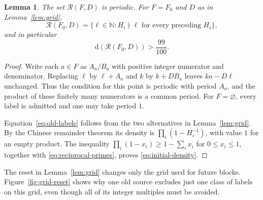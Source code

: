 \documentclass[11pt,reqno]{amsart}
\newtheorem{lemma}[theorem]{Lemma}
\theoremstyle{definition}
\theoremstyle{remark}
\numberwithin{equation}{section}
\newcommand{\N}{\mathbb N}
\newcommand{\dens}{\mathrm d}
\newcommand{\cR}{\mathcal R}
\begin{document}
\begin{lemma}\label{lem:periodicity}
The set $\cR(F,D)$ is periodic. For $F=F_0$ and $D$ as in
Lemma~\ref{lem:grid},
\begin{equation}\label{eq:old-labels}
 \cR(F_0,D)=\{\ell\in\N:H_i\nmid\ell
                     \text{ for every preceding }H_i\},
\end{equation}
and in particular
\begin{equation}\label{eq:initial-density}
 \dens(\cR(F_0,D))>\frac{99}{100}.
\end{equation}
\end{lemma}

\begin{proof}
Write each $a\in F$ as $A_a/B_a$ with positive integer numerator and
denominator. Replacing $\ell$ by $\ell+A_a$ and $k$ by $k+DB_a$ leaves
$ka-D\ell$ unchanged. Thus the condition for this point is periodic
with period $A_a$, and the product of these finitely many numerators is
a common period. For $F=\varnothing$, every label is admitted and one
may take period $1$.

Equation~\eqref{eq:old-labels} follows from the two alternatives in
Lemma~\ref{lem:grid}. By the Chinese remainder theorem its density is
$\prod_i(1-H_i^{-1})$, with value $1$ for an empty product. The inequality
$\prod_i(1-x_i)\geq1-\sum_i x_i$ for $0\leq x_i\leq1$, together with
\eqref{eq:reciprocal-primes}, proves \eqref{eq:initial-density}.
\end{proof}

The reset in Lemma~\ref{lem:grid} changes only the grid used for future
blocks. Figure~\ref{fig:grid-reset} shows why one old source excludes just
one class of labels on this grid, even though all of its integer multiples
must be avoided.
\end{document}
